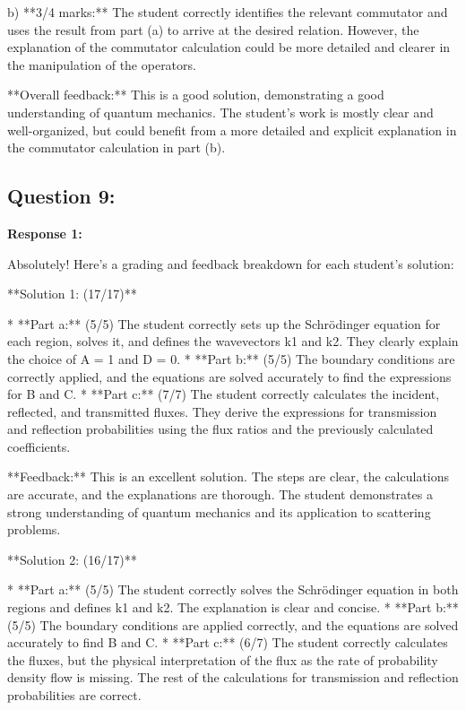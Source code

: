 \documentclass[a4paper,11pt]{article}
\begin{document}
b) **3/4 marks:** The student correctly identifies the relevant commutator and uses the result from part (a) to arrive at the desired relation. However, the explanation of the commutator calculation could be more detailed and clearer in the manipulation of the operators.

**Overall feedback:** This is a good solution, demonstrating a good understanding of quantum mechanics. The student's work is mostly clear and well-organized, but could benefit from a more detailed and explicit explanation in the commutator calculation in part (b).


\subsection{Question 9:}

\textbf{Response 1:}

Absolutely! Here's a grading and feedback breakdown for each student's solution:

**Solution 1: (17/17)**

*   **Part a:** (5/5) The student correctly sets up the Schrödinger equation for each region, solves it, and defines the wavevectors k1 and k2. They clearly explain the choice of A = 1 and D = 0.
*   **Part b:** (5/5) The boundary conditions are correctly applied, and the equations are solved accurately to find the expressions for B and C.
*   **Part c:** (7/7) The student correctly calculates the incident, reflected, and transmitted fluxes. They derive the expressions for transmission and reflection probabilities using the flux ratios and the previously calculated coefficients.

**Feedback:** This is an excellent solution. The steps are clear, the calculations are accurate, and the explanations are thorough. The student demonstrates a strong understanding of quantum mechanics and its application to scattering problems.

**Solution 2: (16/17)**

*   **Part a:** (5/5) The student correctly solves the Schrödinger equation in both regions and defines k1 and k2. The explanation is clear and concise.
*   **Part b:** (5/5) The boundary conditions are applied correctly, and the equations are solved accurately to find B and C.
*   **Part c:** (6/7) The student correctly calculates the fluxes, but the physical interpretation of the flux as the rate of probability density flow is missing. The rest of the calculations for transmission and reflection probabilities are correct.
\end{document}
